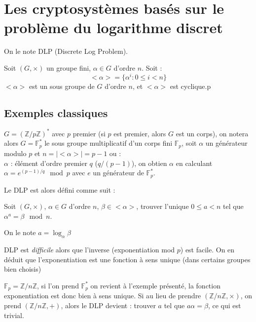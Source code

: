 \documentclass[a4paper, 10pt]{thesis}
\begin{document}
\section{Les cryptosystèmes basés sur le problème du logarithme discret}

On le note DLP (Discrete Log Problem).

Soit $(G, \times)$ un groupe fini, $\alpha \in G$ d'ordre $n$. Soit :
\begin{displaymath}
    <\alpha> = \{\alpha ^ i : 0 \leq i < n \}
\end{displaymath}
$<\alpha>$ est un sous groupe de $G$ d'ordre $n$, et $<\alpha>$ est cyclique.p

\subsection{Exemples classiques}

$G = (\mathbb{Z}/p\mathbb{Z})^*$ avec $p$ premier (si $p$ est premier, alors $G$ est un corps), on
notera alors $G = \mathbb{F}_p^*$ le sous groupe multiplicatif d'un corps fini $\mathbb{F}_p$, soit
$\alpha$ un générateur modulo $p$ et $n = |<\alpha>| = p-1$ ou : \\
$\alpha$ : élément d'ordre premier $q$ ($q / (p-1)$), on obtien $\alpha$ en calculant $\alpha =
e^{(p-1)/q} \mod p$ avec $e$ un générateur de $\mathbb{F}_p^*$.


Le DLP est alors défini comme suit :
\begin{df}
    Soit $(G, \times)$, $\alpha \in G$ d'ordre $n$, $\beta \in <\alpha>$, trouver l'unique $0 \leq a <
    n$ tel que $\alpha^a = \beta \mod n$.

    On le note $a = \log_{\alpha}\beta$
\end{df}

\begin{rmq}
    DLP est \emph{difficile} alors que l'inverse (exponentiation mod $p$) est facile.
    On en déduit que l'exponentiation est une fonction à sens unique (dans certains groupes bien
    choisis)
\end{rmq}

\begin{rmq}
    $\mathbb{F}_p = \mathbb{Z} / n\mathbb{Z}$, si l'on prend $\mathbb{F}_p^*$ on revient à l'exemple
    présenté, la fonction exponentiation est donc bien à sens unique. Si au lieu de prendre
    $(\mathbb{Z}/n\mathbb{Z}, \times)$, on prend $(\mathbb{Z}/n\mathbb{Z}, +)$, alors le DLP devient
    : trouver $a$ tel que $a \alpha = \beta$, ce qui est trivial.
\end{rmq}
\end{document}
